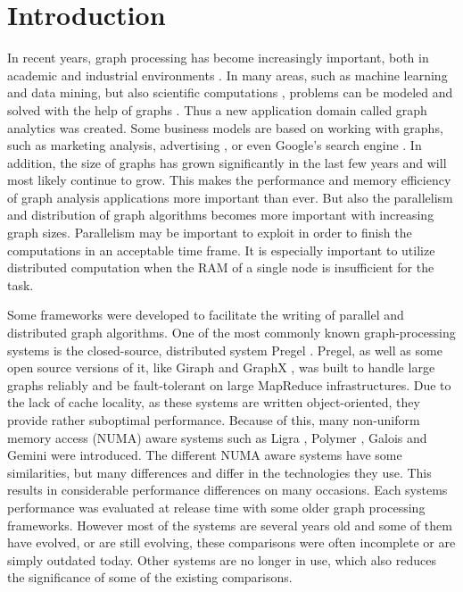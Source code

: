 \section{Introduction}
In recent years, graph processing has become increasingly important, both in academic and industrial environments \cite{Gemini}.
In many areas, such as machine learning and data mining, but also scientific computations , problems can be modeled and solved with the help of graphs \cite{Polymer}.
Thus a new application domain called graph analytics was created.
Some business models are based on working with graphs, such as marketing analysis, advertising , or even Google's search engine \cite{pagerank}.
In addition, the size of graphs has grown significantly in the last few years and will most likely continue to grow.
This makes the performance and memory efficiency of graph analysis applications more important than ever.
But also the parallelism and distribution of graph algorithms becomes more important with increasing graph sizes.
Parallelism may be important to exploit in order to finish the computations in an acceptable time frame.
It is especially important to utilize distributed computation when the RAM of a single node is insufficient for the task.

Some frameworks were developed to facilitate the writing of parallel and distributed graph algorithms.
One of the most commonly known graph-processing systems is the closed-source, distributed system Pregel \cite{pregel}.
Pregel, as well as some open source versions of it, like Giraph \cite{Giraph} and GraphX \cite{graphx}, was built to handle large graphs reliably and be fault-tolerant on large MapReduce infrastructures.
Due to the lack of cache locality, as these systems are written object-oriented, they provide rather suboptimal performance.
Because of this, many non-uniform memory access (NUMA) aware systems such as Ligra \cite{Ligra}, Polymer \cite{Polymer}, Galois \cite{Galois} and Gemini \cite{Gemini} were introduced.
The different NUMA aware systems have some similarities, but many differences and differ in the technologies they use.
This results in considerable performance differences on many occasions.
Each systems performance was evaluated at release time with some older graph processing frameworks.
However most of the systems are several years old and some of them have evolved, or are still evolving, these comparisons were often incomplete or are simply outdated today.
Other systems are no longer in use, which also reduces the significance of some of the existing comparisons.

